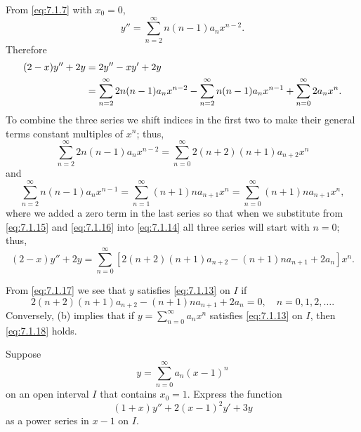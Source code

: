\begin{alistSolution}
\item
From \eqref{eq:7.1.7} with $x_0=0$,
\[
y''=\sum_{n=2}^\infty n(n-1)a_nx^{n-2}.
\]
Therefore
\begin{equation} \label{eq:7.1.14}
\begin{aligned}
(2-x)y''+2y&=2y''-xy'+2y\\
&=\displaystyle{\sum_{n=2}^\infty 2n(n-1)a_nx^{n-2}
-\sum_{n=2}^\infty n(n-1)a_nx^{n-1}
+\sum_{n=0}^\infty 2a_n x^n}.
\end{aligned}
\end{equation}
To combine the three series we  shift indices in the first two to
make their general terms  constant multiples of $x^n$;   thus,
\begin{equation} \label{eq:7.1.15}
\sum_{n=2}^\infty
2n(n-1)a_nx^{n-2}=\sum_{n=0}^\infty2(n+2)(n+1)a_{n+2}x^n
\end{equation}
and
\begin{equation} \label{eq:7.1.16}
\sum_{n=2}^\infty n(n-1)a_nx^{n-1}=\sum_{n=1}^\infty(n+1)na_{n+1}x^n
=\sum_{n=0}^\infty(n+1)na_{n+1}x^n,
\end{equation}
where we added a zero term in the last series so that when we
substitute from \eqref{eq:7.1.15} and \eqref{eq:7.1.16} into \eqref{eq:7.1.14}
all three series will start with $n=0$;   thus,
\begin{equation} \label{eq:7.1.17}
(2-x)y''+2y=\sum_{n=0}^\infty
[2(n+2)(n+1)a_{n+2}-(n+1)na_{n+1}+2a_n]x^n.
\end{equation}

\item From   \eqref{eq:7.1.17}
we see that $y$ satisfies \eqref{eq:7.1.13} on $I$ if
\begin{equation} \label{eq:7.1.18}
2(n+2)(n+1)a_{n+2}-(n+1)na_{n+1}+2a_n=0,\quad n=0,1,2, \dots.
\end{equation}
Conversely, (b) implies that if
$y=\sum_{n=0}^\infty a_nx^n$
satisfies \eqref{eq:7.1.13} on $I$,  then \eqref{eq:7.1.18} holds.
\end{alistSolution}

\begin{example}\label{example:7.1.7}
Suppose
\[
y=\sum_{n=0}^\infty a_n (x-1)^n
\]
 on an open interval $I$ that contains $x_0=1$.
Express the function
\begin{equation} \label{eq:7.1.19}
(1+x)y''+2(x-1)^2y'+3y
\end{equation}
as a power series in $x-1$ on $I$.
\end{example}

